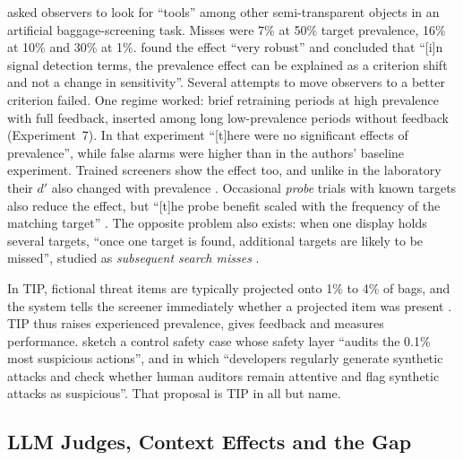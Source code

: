 \documentclass[letterpaper]{article} %
\begin{document}
\citet{wolfe2005} asked observers to look for ``tools'' among other semi-transparent objects in an artificial baggage-screening task. Misses were 7\% at 50\% target prevalence, 16\% at 10\% and 30\% at 1\%. \citet[Abstract]{wolfe2007} found the effect ``very robust'' and concluded that ``[i]n signal detection terms, the prevalence effect can be explained as a criterion shift and not a change in sensitivity''. Several attempts to move observers to a better criterion failed. One regime worked: brief retraining periods at high prevalence with full feedback, inserted among long low-prevalence periods without feedback (Experiment~7). In that experiment ``[t]here were no significant effects of prevalence'', while false alarms were higher than in the authors' baseline experiment. Trained screeners show the effect too, and unlike in the laboratory their $d'$ also changed with prevalence \citep{wolfe2013}. Occasional \emph{probe} trials with known targets also reduce the effect, but ``[t]he probe benefit scaled with the frequency of the matching target'' \citep[Abstract]{becker2026}. The opposite problem also exists: when one display holds several targets, ``once one target is found, additional targets are likely to be missed'', studied as \emph{subsequent search misses} \citep[Abstract]{cain2013}.

In TIP, fictional threat items are typically projected onto 1\% to 4\% of bags, and the system tells the screener immediately whether a projected item was present \citep[Sec.~2]{buser2025}. TIP thus raises experienced prevalence, gives feedback and measures performance. \citet[Sec.~4]{korbak2025} sketch a control safety case whose safety layer ``audits the 0.1\% most suspicious actions'', and in which ``developers regularly generate synthetic attacks and check whether human auditors remain attentive and flag synthetic attacks as suspicious''. That proposal is TIP in all but name.

\subsection{LLM Judges, Context Effects and the Gap}
\end{document}
